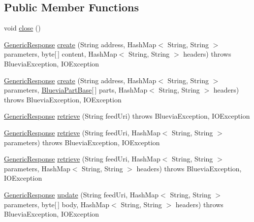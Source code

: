 \subsection*{Public Member Functions}
\begin{DoxyCompactItemize}
\item 
void \hyperlink{classcom_1_1bluevia_1_1commons_1_1connector_1_1http_1_1HttpConnector_a18df8d3daff61d24f994114a8115fe05}{close} ()
\item 
\hyperlink{classcom_1_1bluevia_1_1commons_1_1connector_1_1GenericResponse}{GenericResponse} \hyperlink{classcom_1_1bluevia_1_1commons_1_1connector_1_1http_1_1HttpConnector_aee88afcd82a603dd62691cfff8adac5a}{create} (String address, HashMap$<$ String, String $>$ parameters, byte\mbox{[}$\,$\mbox{]} content, HashMap$<$ String, String $>$ headers)  throws BlueviaException, IOException 
\item 
\hyperlink{classcom_1_1bluevia_1_1commons_1_1connector_1_1GenericResponse}{GenericResponse} \hyperlink{classcom_1_1bluevia_1_1commons_1_1connector_1_1http_1_1HttpConnector_a867a506b38b2a30712795a84fbf6d47c}{create} (String address, HashMap$<$ String, String $>$ parameters, \hyperlink{classcom_1_1bluevia_1_1commons_1_1connector_1_1http_1_1multipart_1_1BlueviaPartBase}{BlueviaPartBase}\mbox{[}$\,$\mbox{]} parts, HashMap$<$ String, String $>$ headers)  throws BlueviaException, IOException 
\item 
\hyperlink{classcom_1_1bluevia_1_1commons_1_1connector_1_1GenericResponse}{GenericResponse} \hyperlink{classcom_1_1bluevia_1_1commons_1_1connector_1_1http_1_1HttpConnector_a249f56891c29f400de4f368ddd326049}{retrieve} (String feedUri)  throws BlueviaException, IOException 
\item 
\hyperlink{classcom_1_1bluevia_1_1commons_1_1connector_1_1GenericResponse}{GenericResponse} \hyperlink{classcom_1_1bluevia_1_1commons_1_1connector_1_1http_1_1HttpConnector_a58cd356baaa4e2631176728575fa6ec9}{retrieve} (String feedUri, HashMap$<$ String, String $>$ parameters)  throws BlueviaException, IOException 
\item 
\hyperlink{classcom_1_1bluevia_1_1commons_1_1connector_1_1GenericResponse}{GenericResponse} \hyperlink{classcom_1_1bluevia_1_1commons_1_1connector_1_1http_1_1HttpConnector_a90285648526b1fc9ca82eb3fb315ba55}{retrieve} (String feedUri, HashMap$<$ String, String $>$ parameters, HashMap$<$ String, String $>$ headers)  throws BlueviaException, IOException 
\item 
\hyperlink{classcom_1_1bluevia_1_1commons_1_1connector_1_1GenericResponse}{GenericResponse} \hyperlink{classcom_1_1bluevia_1_1commons_1_1connector_1_1http_1_1HttpConnector_ab454a390faa34d755842f9d90f75d292}{update} (String feedUri, HashMap$<$ String, String $>$ parameters, byte\mbox{[}$\,$\mbox{]} body, HashMap$<$ String, String $>$ headers)  throws BlueviaException, IOException 

\end{DoxyCompactItemize}
